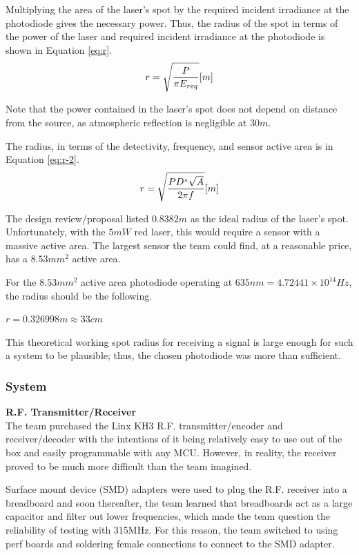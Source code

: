\documentclass[letterpaper,10pt]{article}
\begin{document}
\begin{spacing}{1.15}
Multiplying the area of the laser's spot by the required incident irradiance at the photodiode gives the necessary power. Thus, the radius of the spot in terms of the power of the laser and required incident irradiance at the photodiode is shown in Equation \ref{eq:r}.
\begin{equation} \large \label{eq:r}
	r = \sqrt{\frac{P}{\pi E_{req}}} [m]
\end{equation}

Note that the power contained in the laser's spot does not depend on distance from the source, as atmospheric reflection is negligible at $30 m$.

The radius, in terms of the detectivity, frequency, and sensor active area is in Equation \ref{eq:r-2}.
\begin{equation}\large \label{eq:r-2}
	r = \sqrt{\frac{PD^*\sqrt{A}}{2 \pi f}} [m]
\end{equation}

The design review/proposal listed $0.8382 m$ as the ideal radius of the laser's spot. Unfortunately, with the $5mW$ red laser, this would require a sensor with a massive active area. The largest sensor the team could find, at a reasonable price, has a $8.53 mm^2$ active area. 

For the $8.53 mm^2$ active area photodiode operating at $635 nm = 4.72441 × 10^{14} Hz$, the radius should be the following.
\begin{center}
	$r = 0.326998 m \approx 33 cm$
\end{center}

This theoretical working spot radius for receiving a signal is large enough for such a system to be plausible; thus, the chosen photodiode was more than sufficient. 

\subsubsection{System}

\hspace{5mm}\textbf{R.F. Transmitter/Receiver} \label{section:rf-transmitter-design-procedure} \\
The team purchased the Linx KH3 R.F. transmitter/encoder and receiver/decoder with the intentions of it being relatively easy to use out of the box and easily programmable with any MCU. However, in reality, the receiver proved to be much more difficult than the team imagined. 

Surface mount device (SMD) adapters were used to plug the R.F. receiver into a breadboard and soon thereafter, the team learned that breadboards act as a large capacitor and filter out lower frequencies, which made the team question the reliability of testing with 315MHz. For this reason, the team switched to using perf boards and soldering female connections to connect to the SMD adapter. 


\end{spacing}
\end{document}
